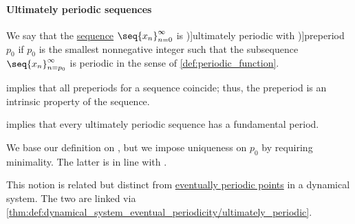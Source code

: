 \paragraph{Ultimately periodic sequences}

\begin{definition}\label{def:ultimately_periodic_sequence}\mimprovised
  We say that the \hyperref[def:sequence]{sequence} \( \seq{ x_n }_{n=0}^\infty \) is \term[en=ultimately periodic (\cite[def. 8.3]{LidlNiederreiter1997FiniteFields})]{ultimately periodic} with \term[en=preperiod (\cite[412]{LidlNiederreiter1997FiniteFields})]{preperiod} \( p_0 \) if \( p_0 \) is the smallest nonnegative integer such that the subsequence \( \seq{ x_n }_{n=p_0}^\infty \) is periodic in the sense of \cref{def:periodic_function}.
\end{definition}
\begin{comments}
  \item {} implies that all preperiods for a sequence coincide; thus, the preperiod is an intrinsic property of the sequence.

  \item {} implies that every ultimately periodic sequence has a fundamental period.

  \item We base our definition on \cite[def. 8.3]{LidlNiederreiter1997FiniteFields}, but we impose uniqueness on \( p_0 \) by requiring minimality. The latter is in line with \cite[exerc. 3.1.6(a)]{Knuth1997ArtVol2}.

  \item This notion is related but distinct from \hyperref[def:dynamical_system_eventual_periodicity]{eventually periodic points} in a dynamical system. The two are linked via \cref{thm:def:dynamical_system_eventual_periodicity/ultimately_periodic}.
\end{comments}

